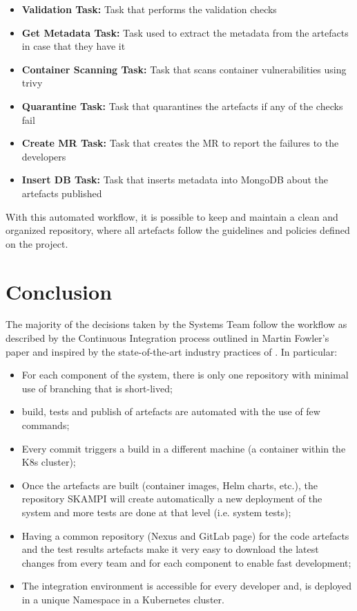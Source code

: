 \documentclass[a4paper,
               keeplastbox,   %
               ]{jacow}
\begin{document}
\begin{itemize}
    \item \textbf{Validation Task:} Task that performs the validation checks 
    \item \textbf{Get Metadata Task:} Task used to extract the metadata from the artefacts in case that they have it
    \item \textbf{Container Scanning Task:} Task that scans container vulnerabilities using trivy
    \item \textbf{Quarantine Task:} Task that quarantines the artefacts if any of the checks fail
    \item \textbf{Create MR Task:} Task that creates the MR to report the failures to the developers
    \item \textbf{Insert DB Task:} Task that inserts metadata into MongoDB about the artefacts published
\end{itemize}

With this automated workflow, it is possible to keep and maintain a clean and organized repository, where all artefacts follow the guidelines and policies defined on the project.


\section{Conclusion}
The majority of the decisions taken by the Systems Team follow the workflow as described by the Continuous Integration process outlined in Martin Fowler’s paper and inspired by the state-of-the-art industry practices of \cite{DevOps, CI, CD}. In particular:
\begin{itemize}
    \item For each component of the system, there is only one repository with minimal use of branching that is short-lived;
    \item build, tests and publish of artefacts are automated with the use of few commands;
    \item Every commit triggers a build in a different machine (a container within the K8s cluster);
    \item Once the artefacts are built (container images, Helm charts, etc.), the repository SKAMPI will create automatically a new deployment of the system and more tests are done at that level (i.e. system tests);
    \item Having a common repository (Nexus and GitLab page) for the code artefacts and the test results artefacts make it very easy to download the latest changes from every team and for each component to enable fast development;
    \item The integration environment is accessible for every developer and, is deployed in a unique Namespace in a Kubernetes cluster.
\end{itemize}
\end{document}
